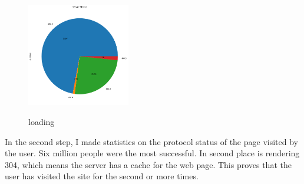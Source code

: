 \documentclass{amsart}
\begin{document}
\begin{figure}
	\centering
	\includegraphics[width=0.4\textwidth]{ll2.png}\\
	\caption{loading}\label{fig:loading}
\end{figure}
In the second step, I made statistics on the protocol status of the page visited by the user.
Six million people were the most successful.
In second place is rendering 304, which means the server has a cache for the web page.
This proves that the user has visited the site for the second or more times.
\end{document}
